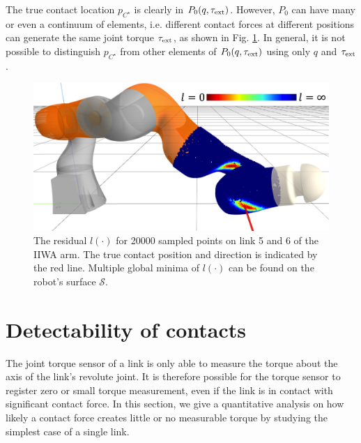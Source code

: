 The true contact location ${p}_{C^\star}$ is clearly in $P_0(q, \tau_{\text{ext}})$. However, $P_0$ can have many or even a continuum of elements, i.e. different contact forces at different positions can generate the same joint torque $\tau_{\text{ext}}$, as shown in Fig. \ref{fig:multiple_local_minima}. In general, it is not possible to distinguish ${p}_{C^\star}$ from other elements of $P_0(q, \tau_{\text{ext}})$ using only $q$ and $\tau_{\text{ext}}$.

\begin{figure}[h]
\centering
\includegraphics[width=0.85\linewidth]{figures/05_force_from_torque/multiple_local_minima.png}
\caption{The residual $l(\cdot)$ for 20000 sampled points on link 5 and 6 of the IIWA arm. The true contact position and direction is indicated by the red line. Multiple global minima of $l(\cdot)$ can be found on the robot's surface $\mathcal{S}$.}
\label{fig:multiple_local_minima}
\end{figure}

\section{Detectability of contacts \label{sec:observability}}
The joint torque sensor of a link is only able to measure the torque about the axis of the link's revolute joint. It is therefore possible for the torque sensor to register zero or small torque measurement, even if the link is in contact with significant contact force. In this section, we give a quantitative analysis on how likely a contact force creates little or no measurable torque by studying the simplest case of a single link.

